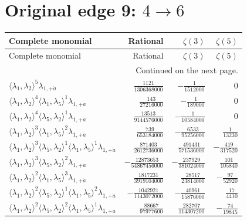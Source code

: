 \section{Original edge 9: $4\to 6$}
\begin{longtable}{@{}lrrr@{}}
\toprule
Complete monomial & Rational & $\zeta(3)$ & $\zeta(5)$ \\
\midrule\endfirsthead
\toprule Complete monomial & Rational & $\zeta(3)$ & $\zeta(5)$ \\
\midrule\endhead
\midrule\multicolumn{4}{r}{Continued on the next page.}\\\endfoot
\bottomrule\endlastfoot
$\langle\lambda_1,\lambda_2\rangle^{5}\lambda_{1,+\dot a}$ & $\frac{1121}{1306368000}$ & $-\frac{1}{1512000}$ & $0$ \\
$\langle\lambda_1,\lambda_2\rangle^{4}\langle\lambda_1,\lambda_5\rangle^{1}\lambda_{1,+\dot a}$ & $\frac{143}{27216000}$ & $-\frac{1}{189000}$ & $0$ \\
$\langle\lambda_1,\lambda_2\rangle^{4}\langle\lambda_5,\lambda_2\rangle^{1}\lambda_{1,+\dot a}$ & $\frac{13513}{9144576000}$ & $-\frac{1}{10584000}$ & $0$ \\
$\langle\lambda_1,\lambda_2\rangle^{3}\langle\lambda_1,\lambda_5\rangle^{2}\lambda_{1,+\dot a}$ & $\frac{739}{653184000}$ & $-\frac{6533}{95256000}$ & $\frac{1}{13230}$ \\
$\langle\lambda_1,\lambda_2\rangle^{3}\langle\lambda_5,\lambda_2\rangle^{1}\langle\lambda_1,\lambda_5\rangle^{1}\lambda_{1,+\dot a}$ & $\frac{871403}{2612736000}$ & $\frac{491431}{571536000}$ & $-\frac{419}{317520}$ \\
$\langle\lambda_1,\lambda_2\rangle^{3}\langle\lambda_5,\lambda_2\rangle^{2}\lambda_{1,+\dot a}$ & $-\frac{12873653}{54867456000}$ & $-\frac{237929}{381024000}$ & $\frac{101}{105840}$ \\
$\langle\lambda_1,\lambda_2\rangle^{2}\langle\lambda_1,\lambda_5\rangle^{3}\lambda_{1,+\dot a}$ & $\frac{1817231}{3919104000}$ & $\frac{28517}{23814000}$ & $-\frac{97}{52920}$ \\
$\langle\lambda_1,\lambda_2\rangle^{2}\langle\lambda_5,\lambda_2\rangle^{1}\langle\lambda_1,\lambda_5\rangle^{2}\lambda_{1,+\dot a}$ & $-\frac{1042921}{1143072000}$ & $-\frac{40961}{15876000}$ & $\frac{17}{4410}$ \\
$\langle\lambda_1,\lambda_2\rangle^{2}\langle\lambda_5,\lambda_2\rangle^{2}\langle\lambda_1,\lambda_5\rangle^{1}\lambda_{1,+\dot a}$ & $\frac{88667}{97977600}$ & $\frac{282707}{114307200}$ & $-\frac{74}{19845}$ \\

\end{longtable}
